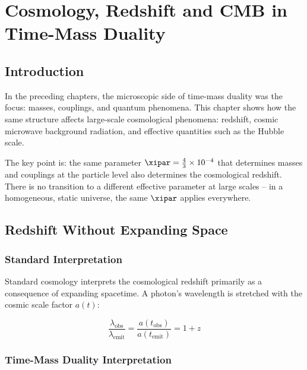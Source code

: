 
\chapter{Cosmology, Redshift and CMB in Time-Mass Duality}

\section{Introduction}

In the preceding chapters, the microscopic side of time-mass duality was the 
focus: masses, couplings, and quantum phenomena. This chapter shows how the 
same structure affects large-scale cosmological phenomena: redshift, cosmic 
microwave background radiation, and effective quantities such as the Hubble scale.

The key point is: the same parameter $\xipar = \frac{4}{3} \times 10^{-4}$ 
that determines masses and couplings at the particle level also determines 
the cosmological redshift. There is no transition to a different effective 
parameter at large scales -- in a homogeneous, static universe, the same 
$\xipar$ applies everywhere.

\section{Redshift Without Expanding Space}

\subsection{Standard Interpretation}

Standard cosmology interprets the cosmological redshift primarily as a 
consequence of expanding spacetime. A photon's wavelength is stretched 
with the cosmic scale factor $a(t)$:

\begin{equation}
\frac{\lambda_{\text{obs}}}{\lambda_{\text{emit}}} = \frac{a(t_{\text{obs}})}{a(t_{\text{emit}})} = 1 + z
\end{equation}

\subsection{Time-Mass Duality Interpretation}


